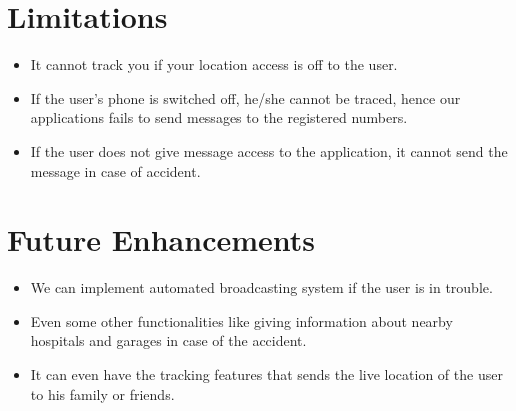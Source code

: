 \documentclass{article}
\begin{document}
\begin{flushleft}
            \newpage
    
    \section{Limitations}
    \begin{itemize}
        \item It cannot track you if your location access is off to the user.
        \item If the user's phone is switched off,  he/she cannot be traced, hence our applications fails to send messages to the registered numbers.
        \item If the user does not give message access to the application, it cannot send the message in case of accident.
        
    \end{itemize}
    
    \section{Future Enhancements}
    \begin{itemize}
        \item We can implement automated broadcasting system if the user is in trouble.
        \item Even some other functionalities like giving information about nearby hospitals and garages in case of the accident.
        \item It can even have the tracking features that sends the live location of the user to his family or friends.
    \end{itemize}
    \newpage
    

\end{flushleft}
\end{document}
